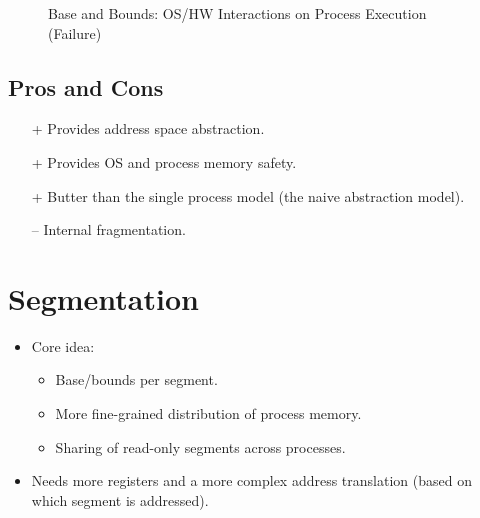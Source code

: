 \begin{figure}[H]
                	\caption{Base and Bounds: OS/HW Interactions on Process Execution (Failure)}
                \end{figure}

        \subsection{Pros and Cons}
            \begin{itemize}
            	\item[+] Provides address space abstraction.
            	\item[+] Provides OS and process memory safety.
            	\item[+] Butter than the single process model (the naive abstraction model).
            	\item[--] Internal fragmentation.
            \end{itemize}

    \section{Segmentation} %
        
        \begin{itemize}
        	\item Core idea:
            	\begin{itemize}
            		\item Base/bounds per segment.
            		\item More fine-grained distribution of process memory.
            		\item Sharing of read-only segments across processes.
            	\end{itemize}
        	\item Needs more registers and a more complex address translation (based on which segment is addressed).
        \end{itemize}


